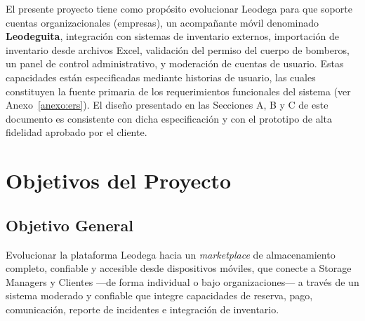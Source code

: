 El presente proyecto tiene como propósito evolucionar Leodega para que soporte cuentas organizacionales (empresas), un acompañante móvil denominado \textbf{Leodeguita}, integración con sistemas de inventario externos, importación de inventario desde archivos Excel, validación del permiso del cuerpo de bomberos, un panel de control administrativo, y moderación de cuentas de usuario. Estas capacidades están especificadas mediante historias de usuario, las cuales constituyen la fuente primaria de los requerimientos funcionales del sistema (ver Anexo~\ref{anexo:ers}). El diseño presentado en las Secciones A, B y C de este documento es consistente con dicha especificación y con el prototipo de alta fidelidad aprobado por el cliente.

\section{Objetivos del Proyecto}

\subsection*{Objetivo General}
Evolucionar la plataforma Leodega hacia un \textit{marketplace} de almacenamiento completo, confiable y accesible desde dispositivos móviles, que conecte a Storage Managers y Clientes ---de forma individual o bajo organizaciones--- a través de un sistema moderado y confiable que integre capacidades de reserva, pago, comunicación, reporte de incidentes e integración de inventario.

